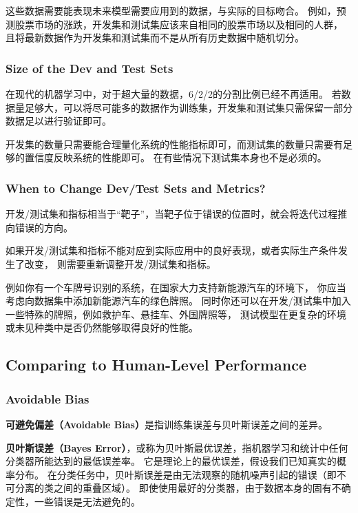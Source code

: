 这些数据需要能表现未来模型需要应用到的数据，与实际的目标吻合。
例如，预测股票市场的涨跌，开发集和测试集应该来自相同的股票市场以及相同的人群，
且将最新数据作为开发集和测试集而不是从所有历史数据中随机切分。

\subsubsection{Size of the Dev and Test Sets}

在现代的机器学习中，对于超大量的数据，6/2/2的分割比例已经不再适用。
若数据量足够大，可以将尽可能多的数据作为训练集，开发集和测试集只需保留一部分数据足以进行验证即可。

开发集的数量只需要能合理量化系统的性能指标即可，而测试集的数量只需要有足够的置信度反映系统的性能即可。
在有些情况下测试集本身也不是必须的。

\subsubsection{When to Change Dev/Test Sets and Metrics?}

开发/测试集和指标相当于“靶子”，当靶子位于错误的位置时，就会将迭代过程推向错误的方向。

如果开发/测试集和指标不能对应到实际应用中的良好表现，或者实际生产条件发生了改变，
则需要重新调整开发/测试集和指标。

例如你有一个车牌号识别的系统，在国家大力支持新能源汽车的环境下，
你应当考虑向数据集中添加新能源汽车的绿色牌照。
同时你还可以在开发/测试集中加入一些特殊的牌照，例如救护车、悬挂车、外国牌照等，
测试模型在更复杂的环境或未见种类中是否仍然能够取得良好的性能。


\subsection{Comparing to Human-Level Performance}

\subsubsection{Avoidable Bias}

\textbf{可避免偏差（Avoidable Bias）}是指训练集误差与贝叶斯误差之间的差异。

\textbf{贝叶斯误差（Bayes Error）}，或称为贝叶斯最优误差，指机器学习和统计中任何分类器所能达到的最低误差率。
它是理论上的最优误差，假设我们已知真实的概率分布。
在分类任务中，贝叶斯误差是由无法观察的随机噪声引起的错误（即不可分离的类之间的重叠区域）。
即使使用最好的分类器，由于数据本身的固有不确定性，一些错误是无法避免的。

